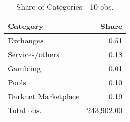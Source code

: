 \begin{table}[ht]
\centering
\begin{tabular}{lr}
  \hline
Category & Share \\ 
  \hline
Exchanges & 0.51 \\ 
  Services/others & 0.18 \\ 
  Gambling & 0.01 \\ 
  Pools & 0.10 \\ 
  Darknet Marketplace & 0.19 \\ 
  Total obs. & 243,902.00 \\ 
   \hline
\end{tabular}
\caption{Share of Categories - 10 obs.} 
\label{sh_cat_10obs}
\end{table}
